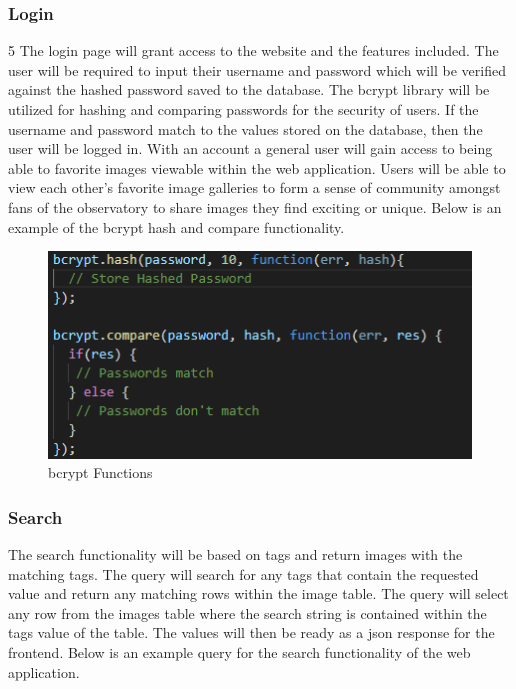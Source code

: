 \documentclass[12pt]{report}
\begin{document}
\begin{enumerate}
\subsubsection*{Login}
5
The login page will grant access to the website and the features included.  The user will be required to input their username and password which will be verified against the hashed password saved to the database.  The bcrypt library will be utilized for hashing and comparing passwords for the security of users.  If the username and password match to the values stored on the database, then the user will be logged in.  With an account a general user will gain access to being able to favorite images viewable within the web application.  Users will be able to view each other’s favorite image galleries to form a sense of community amongst fans of the observatory to share images they find exciting or unique.  Below is an example of the bcrypt hash and compare functionality.

\begin{figure}[h]
	\centering
	\includegraphics[scale=0.5]{api_bcrypt}
	\caption{bcrypt Functions}
	\label{fig:API bcrypt}
\end{figure}

\subsubsection*{Search}

The search functionality will be based on tags and return images with the matching tags.  The query will search for any tags that contain the requested value and return any matching rows within the image table.  The query will select any row from the images table where the search string is contained within the tags value of the table.  The values will then be ready as a json response for the frontend.  Below is an example query for the search functionality of the web application.


\end{enumerate}
\end{document}
